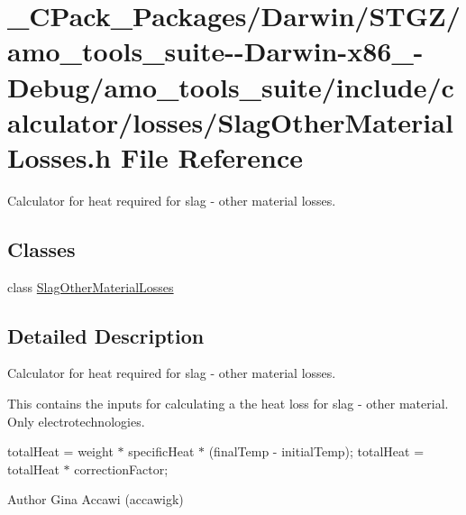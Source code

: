 \hypertarget{___c_pack___packages_2_darwin_2_s_t_g_z_2amo__tools__suite--_darwin-x86__64-_debug_2amo__tools__a360f170cb779488bbc84e310d33960e}{}\section{\+\_\+\+C\+Pack\+\_\+\+Packages/\+Darwin/\+S\+T\+G\+Z/amo\+\_\+tools\+\_\+suite-\/-\/\+Darwin-\/x86\+\_-\/\+Debug/amo\+\_\+tools\+\_\+suite/include/calculator/losses/\+Slag\+Other\+Material\+Losses.h File Reference}
\label{___c_pack___packages_2_darwin_2_s_t_g_z_2amo__tools__suite--_darwin-x86__64-_debug_2amo__tools__a360f170cb779488bbc84e310d33960e}


Calculator for heat required for slag -\/ other material losses.  


\subsection*{Classes}
\begin{DoxyCompactItemize}
\item 
class \hyperlink{class_slag_other_material_losses}{Slag\+Other\+Material\+Losses}
\end{DoxyCompactItemize}


\subsection{Detailed Description}
Calculator for heat required for slag -\/ other material losses. 

This contains the inputs for calculating a the heat loss for slag -\/ other material. Only electrotechnologies.

total\+Heat = weight $\ast$ specific\+Heat $\ast$ (final\+Temp -\/ initial\+Temp); total\+Heat = total\+Heat $\ast$ correction\+Factor;

\begin{DoxyAuthor}{Author}
Gina Accawi (accawigk) 
\end{DoxyAuthor}
